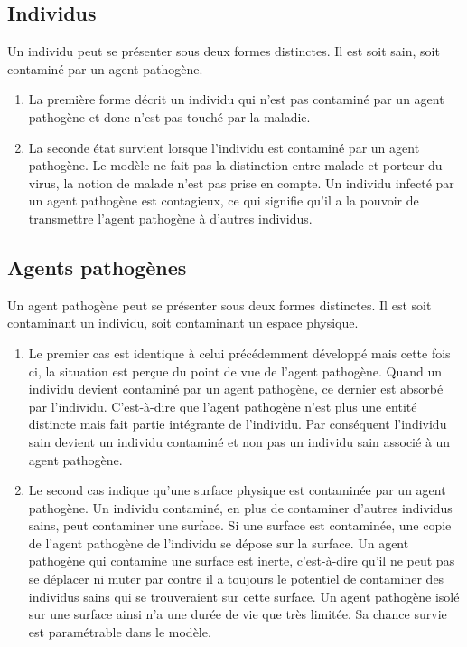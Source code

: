 \subsection{Individus}

Un individu peut se présenter sous deux formes distinctes. Il est soit sain, soit contaminé par un agent pathogène.\\

\begin{enumerate}
	\item La première forme décrit un individu qui n'est pas contaminé par un agent pathogène et donc n'est pas touché par la maladie.
	\item La seconde état survient lorsque l'individu est contaminé par un agent pathogène. Le modèle ne fait pas la distinction entre malade et porteur du virus, la notion de malade n'est pas prise en compte. Un individu infecté par un agent pathogène est contagieux, ce qui signifie qu'il a la pouvoir de transmettre l'agent pathogène à d'autres individus.
\end{enumerate}

\subsection{Agents pathogènes}

Un agent pathogène peut se présenter sous deux formes distinctes. Il est soit contaminant un individu, soit contaminant un espace physique.

\begin{enumerate}
\item Le premier cas est identique à celui précédemment développé mais cette fois ci, la situation est perçue du point de vue de l'agent pathogène. Quand un individu devient contaminé par un agent pathogène, ce dernier est absorbé par l'individu. C'est-à-dire que l'agent pathogène n'est plus une entité distincte mais fait partie intégrante de l'individu. Par conséquent l'individu sain devient un individu contaminé et non pas un individu sain associé à un agent pathogène.
\item Le second cas indique qu'une surface physique est contaminée par un agent pathogène. Un individu contaminé, en plus de contaminer d'autres individus sains, peut contaminer une surface. Si une surface est contaminée, une copie de l'agent pathogène de l'individu se dépose sur la surface. Un agent pathogène qui contamine une surface est inerte, c'est-à-dire qu'il ne peut pas se déplacer ni muter par contre il a toujours le potentiel de contaminer des individus sains qui se trouveraient sur cette surface. Un agent pathogène isolé sur une surface ainsi n'a une durée de vie que très limitée. Sa chance survie est paramétrable dans le modèle.
\end{enumerate}

